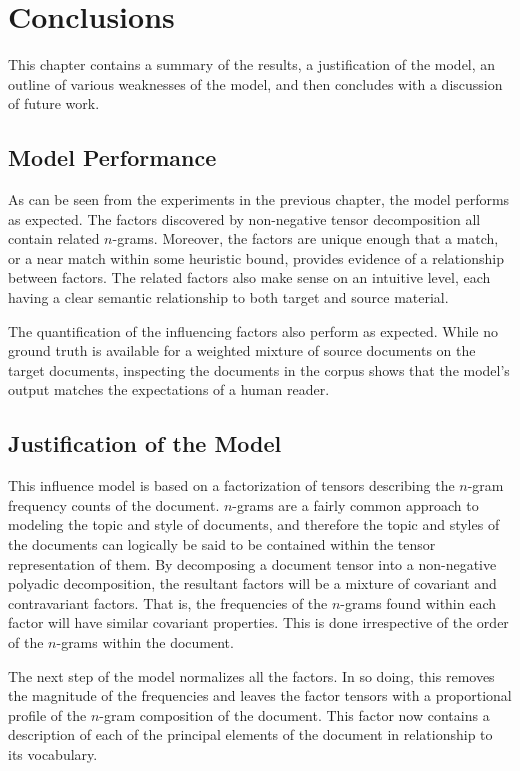 \documentclass[../ut-dissertation.tex]{subfiles}
\begin{document}
\chapter{Conclusions}
This chapter contains a summary of the results, a justification of the
model, an outline of various weaknesses of the model, and then
concludes with a discussion of future work.

\section{Model Performance}
As can be seen from the experiments in the previous chapter, the model
performs as expected.  The factors discovered by non-negative tensor
decomposition all contain related $n$-grams.  Moreover, the factors
are unique enough that a match, or a near match within some heuristic
bound, provides evidence of a relationship between factors.  The
related factors also make sense on an intuitive level, each having a
clear semantic relationship to both target and source material.

The quantification of the influencing factors also perform as
expected.  While no ground truth is available for a weighted mixture
of source documents on the target documents, inspecting the documents
in the corpus shows that the model's output matches the expectations
of a human reader.  


\section{Justification of the Model}
This influence model is based on a factorization of tensors describing
the $n$-gram frequency counts of the document.  $n$-grams are a fairly
common approach to modeling the topic and style of documents, and
therefore the topic and styles of the documents can logically be said
to be contained within the tensor representation of them.  By
decomposing a document tensor into a non-negative polyadic
decomposition, the resultant factors will be a mixture of covariant
and contravariant factors.  That is, the frequencies of the $n$-grams
found within each factor will have similar covariant properties.  This
is done irrespective of the order of the $n$-grams within the
document.

The next step of the model normalizes all the factors.  In so doing,
this removes the magnitude of the frequencies and leaves the factor
tensors with a proportional profile of the $n$-gram composition of the
document.  This factor now contains a description of each of the
principal elements of the document in relationship to its vocabulary.
\end{document}
